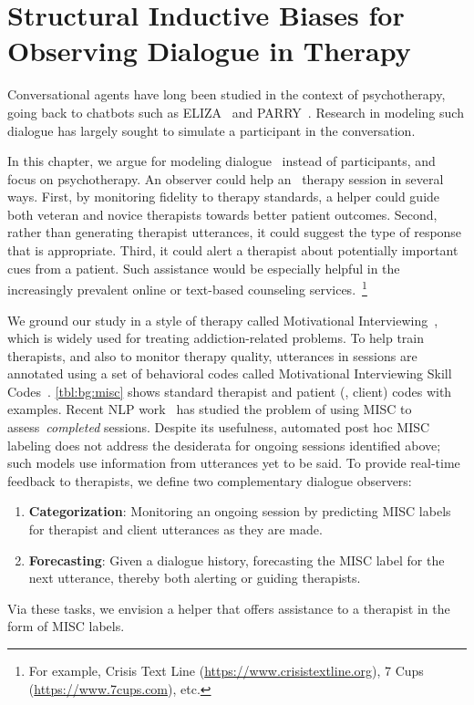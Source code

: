 \chapter{Structural Inductive Biases for Observing Dialogue in
  Therapy }
\label{chap:snt}

Conversational agents have long been studied in the context of
psychotherapy, going back to chatbots such as
ELIZA~\citep{weizenbaum1966eliza} and
PARRY~\citep{colby1975artificial}. Research in modeling such dialogue
has largely sought to simulate a participant in the conversation.

In this chapter, we argue for modeling dialogue~
instead of participants, and focus on psychotherapy. An observer
could help an~ therapy session in several ways.
First, by monitoring fidelity to therapy standards, a helper could
guide both veteran and novice therapists towards better patient
outcomes. Second, rather than generating therapist utterances, it
could suggest the type of response that is appropriate. Third, it
could alert a therapist about potentially important cues from a
patient.
%
Such assistance would be especially helpful in the increasingly
prevalent online or text-based counseling services.~\footnote{For
  example, Crisis Text Line (\url{https://www.crisistextline.org}),
  7 Cups (\url{https://www.7cups.com}), etc.}

We ground our study in a style of therapy called Motivational
Interviewing~\citep[MI,][]{miller2003motivational,miller2012motivational},
which is widely used for treating addiction-related problems.
%
To help train therapists, and also to monitor therapy quality,
utterances in sessions are annotated using a set of behavioral codes
called Motivational Interviewing Skill
Codes~\citep[MISC,][]{miller2003manual}. \autoref{tbl:bg:misc} shows
standard therapist and patient (\ie, client) codes with
examples. Recent NLP work~\cite[][{\em inter
  alia}]{tanana2016comparison, xiao2016behavioral,
  perez2017predicting, huang2018modeling} has studied the problem of
using MISC to assess~\emph{completed} sessions.  Despite its
usefulness, automated post hoc MISC labeling does not address the
desiderata for ongoing sessions identified above; such models use
information from utterances yet to be said. To provide real-time
feedback to therapists, we define two complementary dialogue
observers:
\begin{enumerate}[nosep]
\item \textbf{Categorization}: Monitoring an ongoing session by
  predicting MISC labels for therapist and client utterances as they
  are made.
\item \textbf{Forecasting}: Given a dialogue history, forecasting
  the MISC label for the next utterance, thereby both alerting or
  guiding therapists.
\end{enumerate}
Via these tasks, we envision a helper that offers assistance to a
therapist in the form of MISC labels.

